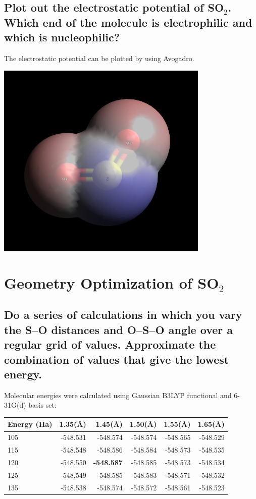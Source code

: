 \documentclass[11pt]{article}
\begin{document}
\subsection{Plot out the electrostatic potential of SO\(_{\text{2}}\). Which end of the molecule is electrophilic and which is nucleophilic?}
\label{sec:org86115f5}

The electrostatic potential can be plotted by using Avogadro.

\begin{center}
\includegraphics[width=4in]{./SO2/SO2.png}
\end{center}

\section{Geometry Optimization of SO\(_{\text{2}}\)}
\label{sec:orgdbc0177}

\subsection{Do a series of calculations in which you vary the S–O distances and O–S–O angle over a regular grid of values. Approximate the combination of values that give the lowest energy.}
\label{sec:org25d5d35}

Molecular energies were calculated using Gaussian B3LYP functional and 6-31G(d) basis set:

\begin{center}
\begin{tabular}{lrrrrr}
Energy (Ha) & 1.35(\AA{}) & 1.45(\AA{}) & 1.50(\AA{}) & 1.55(\AA{}) & 1.65(\AA{})\\
\hline
105\textdegree{} & -548.531 & -548.574 & -548.574 & -548.565 & -548.529\\
115\textdegree{} & -548.548 & -548.586 & -548.584 & -548.573 & -548.535\\
120\textdegree{} & -548.550 & \textbf{-548.587} & -548.585 & -548.573 & -548.534\\
125\textdegree{} & -548.549 & -548.585 & -548.583 & -548.571 & -548.532\\
135\textdegree{} & -548.538 & -548.574 & -548.572 & -548.561 & -548.523\\
\end{tabular}
\end{center}
\end{document}
